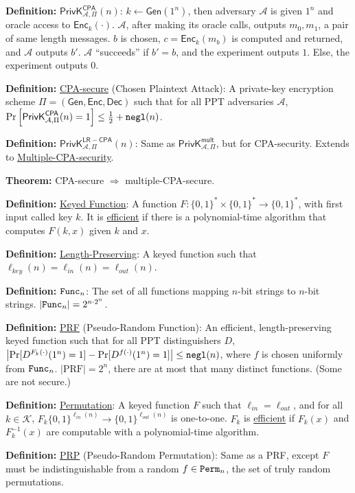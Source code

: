 \documentclass[12pt]{article}
\newcommand{\AAA}{\mathcal{A}}
\newcommand{\KKK}{\mathcal{K}}
\newcommand{\defn}[1]{{\bf Definition:} \underline{#1}}
\newcommand{\thm}[1]{{\bf Theorem:} \underline{#1}}
\newcommand{\Enc}{\mathsf{Enc}}
\newcommand{\Dec}{\mathsf{Dec}}
\newcommand{\Gen}{\mathsf{Gen}}
\newcommand{\GenEncDec}{(\Gen,\Enc,\Dec)}
\newcommand{\ExptMultArgs}[2]{\mathsf{PrivK}^{\mathsf{mult}}_{#1,#2}}
\newcommand{\ExptCpaArgs}[2]{\mathsf{PrivK}^{\mathsf{CPA}}_{#1,#2}}
\newcommand{\ExptLrCpa}{\mathsf{PrivK}^{\mathsf{LR-CPA}}_{\AAA,\Pi}}
\newcommand{\ExptMult}{\ExptMultArgs{\AAA}{\Pi}}
\newcommand{\ExptCpa}{\ExptCpaArgs{\AAA}{\Pi}}
\newcommand{\negl}{{\tt negl}}
\newcommand{\from}{\leftarrow}
\begin{document}
\begin{multicols}{3}

\defn{$\ExptCpa(n)$}: $k\from\Gen(1^n)$, then adversary $\AAA$ is given $1^n$ and oracle access to $\Enc_k(\cdot)$. $\AAA$, after making its oracle calls, outputs $m_0,m_1$, a pair of same length messages. $b$ is chosen, $c=\Enc_k(m_b)$ is computed and returned, and $\AAA$ outputs $b'$. $\AAA$ ``succeeds'' if $b'=b$, and the experiment outputs $1$. Else, the experiment outputs $0$.

\defn{CPA-secure} (Chosen Plaintext Attack): A private-key encryption scheme $\Pi=\GenEncDec$ such that for all PPT adversaries $\AAA$, $\Pr\left[\ExptCpa(n)=1\right]\leq\frac{1}{2}+\negl(n)$.

\defn{$\ExptLrCpa(n)$}: Same as $\ExptMult$, but for CPA-security. Extends to \underline{Multiple-CPA-security}.

\thm{}CPA-secure $\Rightarrow$ multiple-CPA-secure.

\defn{Keyed Function}: A function $F:\{0,1\}^*\times\{0,1\}^*\to\{0,1\}^*$, with first input called key $k$. It is \underline{efficient} if there is a polynomial-time algorithm that computes $F(k,x)$ given $k$ and $x$.

\defn{Length-Preserving}: A keyed function such that $\ell_{key}(n)=\ell_{in}(n)=\ell_{out}(n)$.

\defn{${\tt Func}_n$}: The set of all functions mapping $n$-bit strings to $n$-bit strings. $|{\tt Func}_n|=2^{n\cdot2^n}$.

\defn{PRF} (Pseudo-Random Function): An efficient, length-preserving keyed function such that for all PPT distinguishers $D$, $\left|\Pr[D^{F_k(\cdot)}(1^n)=1]-\Pr[D^{f(\cdot)}(1^n)=1]\right|\leq\negl(n)$, where $f$ is chosen uniformly from ${\tt Func}_n$. $|\text{PRF}|=2^n$, there are at most that many distinct functions. (Some are not secure.)

\defn{Permutation}: A keyed function $F$ such that $\ell_{in}=\ell_{out}$, and for all $k\in\KKK$, $F_k\{0,1\}^{\ell_{in}(n)}\to\{0,1\}^{\ell_{out}(n)}$ is one-to-one. $F_k$ is \underline{efficient} if $F_k(x)$ and $F_k^{-1}(x)$ are computable with a polynomial-time algorithm.

\defn{PRP} (Pseudo-Random Permutation): Same as a PRF, except $F$ must be indistinguishable from a random $f\in{\tt Perm}_n$, the set of truly random permutations.


\end{multicols}
\end{document}
